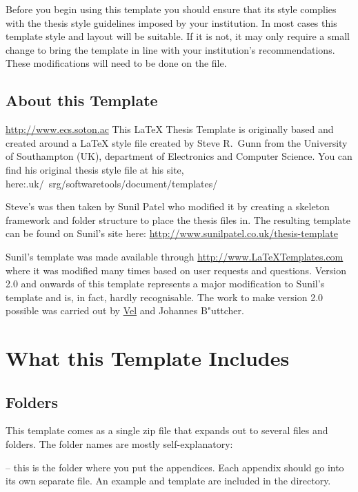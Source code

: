 Before you begin using this template you should ensure that its style complies with the thesis style guidelines imposed by your institution. In most cases this template style and layout will be suitable. If it is not, it may only require a small change to bring the template in line with your institution's recommendations. These modifications will need to be done on the  file.

\subsection{About this Template}


\url{http://www.ecs.soton.ac} This \LaTeX{} Thesis Template is originally based
and created around a \LaTeX{} style file created by Steve R.\ Gunn from the
University of Southampton (UK), department of Electronics and Computer Science.
You can find his original thesis style file at his site,
here:.uk/~srg/softwaretools/document/templates/

Steve's  was then taken by Sunil Patel who modified it by
creating a skeleton framework and folder structure to place the thesis files in.
The resulting template can be found on Sunil's site here:
\url{http://www.sunilpatel.co.uk/thesis-template}

Sunil's template was made available through \url{http://www.LaTeXTemplates.com}
where it was modified many times based on user requests and questions. Version
2.0 and onwards of this template represents a major modification to Sunil's
template and is, in fact, hardly recognisable. The work to make version 2.0
possible was carried out by \href{mailto:vel@latextemplates.com}{Vel} and
Johannes B"{u}ttcher.


\section{What this Template Includes}

\subsection{Folders}

This template comes as a single zip file that expands out to several files and
folders. The folder names are mostly self-explanatory:

 -- this is the folder where you put the appendices. Each
appendix should go into its own separate  file. An example and
template are included in the directory.

